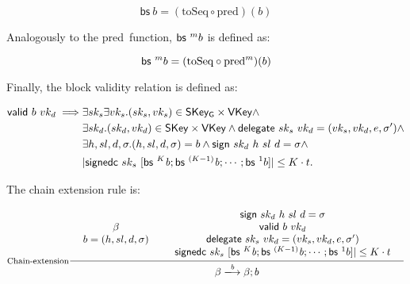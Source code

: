 \documentclass[11pt,a4paper]{article}
\newcommand{\var}[1]{\mathit{#1}}
\newcommand{\fun}[1]{\mathsf{#1}}
\newcommand{\type}[1]{\mathsf{#1}}
\newcommand{\trans}[2]{\xlongrightarrow[\textsc{#1}]{#2}}
\newcommand{\SKey}{\type{SKey}}
\newcommand{\SKeyGen}{\type{SKey_G}}
\newcommand{\VKey}{\type{VKey}}
\newcommand{\signname}{sign}
\newcommand{\signedseqname}{signedc}
\newcommand{\delegatename}{delegate}
\newcommand{\validname}{valid}
\newcommand{\predbname}{pred} %
\newcommand{\toseqname}{toSeq} %
\newcommand{\predbseqname}{bs} %
\newcommand{\sign}[4]{\fun{\signname}\ #1 ~ #2 ~ #3 ~ #4}
\newcommand{\signedwindow}[2]{\fun{\signedseqname}\ #1 ~ #2}
\newcommand{\delegate}[2]{\fun{\delegatename}\ #1 ~ #2}
\newcommand{\valid}[2]{\fun{\validname} ~ #1 ~ #2}
\newcommand{\predbseq}[1]{\fun{\predbseqname} ~ #1}
\begin{document}
\begin{equation}
  \label{eq:predbseq}
  \predbseq{b} = (\text{\toseqname} \circ \text{\predbname})(b)
\end{equation}

Analogously to the \predbname\ function, $\predbseq^m{b}$ is defined as:

\begin{equation}
  \label{eq:predbseqton}
  \predbseq^m{b} = (\text{\toseqname} \circ \text{\predbname}^m)(b)
\end{equation}

Finally, the block validity relation is defined as:

\begin{align}
  \label{eq:valid-block}
    \valid{b}{vk_d} \implies &
      \exists sk_s \exists vk_s. (sk_s, vk_s) \in \SKeyGen \times \VKey \wedge \\
      & \exists sk_d. (sk_d, vk_d) \in \SKey \times \VKey \wedge
      \delegate{sk_s}{vk_d} = (vk_s, vk_d, e, \sigma') \wedge \\
      & \exists h, sl, d, \sigma. (h, sl, d, \sigma) = b \wedge
        \sign{sk_d}{h}{sl}{d} = \sigma \wedge \\
      & | \signedwindow{sk_s}{[\predbseq^K\var{b}; \predbseq^{(K-1)}\var{b}; \cdots; \predbseq^1{b}]} | \leq K \cdot t.
\end{align}

The chain extension rule is:

\begin{equation}
  \label{eq:chain-extension}
  \inference[Chain-extension]
  {
    {\begin{array}{c}
       \beta \\
       b = (h, sl, d, \sigma)
    \end{array}}
    &
    {\begin{array}{c}
       \sign{sk_d}{h}{sl}{d} = \sigma \\
       \valid{b}{vk_d} \\
       \delegate{sk_s}{vk_d} = (vk_s, vk_d, e, \sigma') \\
       \signedwindow{sk_s}{[\predbseq^K\var{b}; \predbseq^{(K-1)}\var{b}; \cdots; \predbseq^1{b}]} | \leq K \cdot t
    \end{array}}
  }
  {\beta \trans{}{\var{b}} {\beta; b}}
\end{equation}
\end{document}
